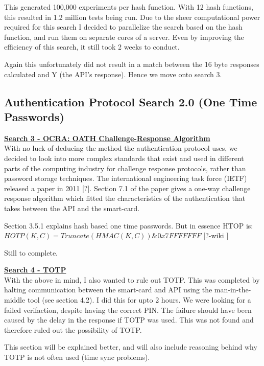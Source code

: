 \documentclass[bsc,frontabs,twoside,singlespacing,parskip,deptreport]{infthesis}     %
\begin{document}
This generated 100,000 experiments per hash function. With 12 hash functions, this resulted in 1.2 million tests being run. Due to the sheer computational power required for this search I decided to parallelize the search based on the hash function, and run them on separate cores of a server. Even by improving the efficiency of this search, it still took 2 weeks to conduct.

Again this unfortunately did not result in a match between the 16 byte responses calculated and Y (the API's response). Hence we move onto search 3.\\

\subsection{Authentication Protocol Search 2.0 (One Time Passwords)}

\textbf{\underline{Search 3 - OCRA: OATH Challenge-Response Algorithm}}\\
With no luck of deducing the method the authentication protocol uses, we decided to look into more complex standards that exist and used in different parts of the computing industry for challenge response protocols, rather than password storage techniques. The international engineering task force (IETF) released a paper in 2011 [?]. Section 7.1 of the paper gives a one-way challenge response algorithm which fitted the characteristics of the authentication that takes between the API and the smart-card.

Section 3.5.1 explains hash based one time passwords. But in essence HTOP is:\\
$HOTP(K,C) = Truncate(HMAC(K,C)) \& 0x7FFFFFFF$ [?-wiki ]

Still to complete.


\textbf{\underline{Search 4 - TOTP}}\\
With the above in mind, I also wanted to rule out TOTP. This was completed by halting communication between the smart-card and API using the man-in-the-middle tool (see section 4.2). I did this for upto 2 hours. We were looking for a failed verifaction, despite having the correct PIN. The failure should have been caused by the delay in the response if TOTP was used. This was not found and therefore ruled out the possibility of TOTP. 

This section will be explained better, and will also include reasoning behind why TOTP is not often used (time sync problems). \\
\end{document}
